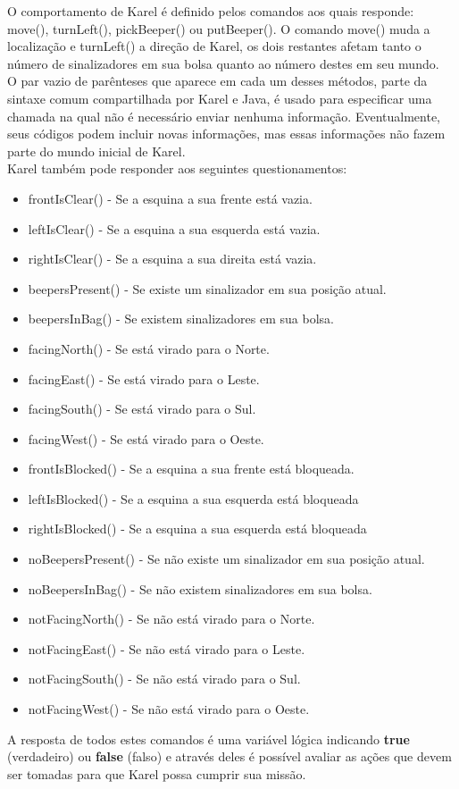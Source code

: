 \documentclass[a4paper,11pt]{article}
\begin{document}
O comportamento de Karel é definido pelos comandos aos quais responde: move(), turnLeft(), pickBeeper() ou putBeeper(). O comando move() muda a localização e turnLeft() a direção de Karel, os dois restantes afetam tanto o número de sinalizadores em sua bolsa quanto ao número destes em seu mundo. \\[3mm]
O par vazio de parênteses que aparece em cada um desses métodos, parte da sintaxe comum compartilhada por Karel e Java, é usado para especificar uma chamada na qual não é necessário enviar nenhuma informação. Eventualmente, seus códigos podem incluir novas informações, mas essas informações não fazem parte do mundo inicial de Karel. \\[3mm]
Karel também pode responder aos seguintes questionamentos:
\begin{itemize}
 \item frontIsClear() - Se a esquina a sua frente está vazia.
 \item leftIsClear() - Se a esquina a sua esquerda está vazia.
 \item rightIsClear() - Se a esquina a sua direita está vazia.
 \item beepersPresent() - Se existe um sinalizador em sua posição atual.
 \item beepersInBag() - Se existem sinalizadores em sua bolsa.
 \item facingNorth() - Se está virado para o Norte.
 \item facingEast() - Se está virado para o Leste.
 \item facingSouth() - Se está virado para o Sul.
 \item facingWest() - Se está virado para o Oeste.
 \item frontIsBlocked() - Se a esquina a sua frente está bloqueada.
 \item leftIsBlocked() - Se a esquina a sua esquerda está bloqueada
 \item rightIsBlocked() - Se a esquina a sua esquerda está bloqueada
 \item noBeepersPresent() - Se não existe um sinalizador em sua posição atual.
 \item noBeepersInBag() - Se não existem sinalizadores em sua bolsa.
 \item notFacingNorth() - Se não está virado para o Norte.
 \item notFacingEast() - Se não está virado para o Leste.
 \item notFacingSouth() - Se não está virado para o Sul.
 \item notFacingWest() - Se não está virado para o Oeste.
\end{itemize} 
A resposta de todos estes comandos é uma variável lógica indicando \textbf{true} (verdadeiro) ou \textbf{false} (falso) e através deles é possível avaliar as ações que devem ser tomadas para que Karel possa cumprir sua missão.
\end{document}
